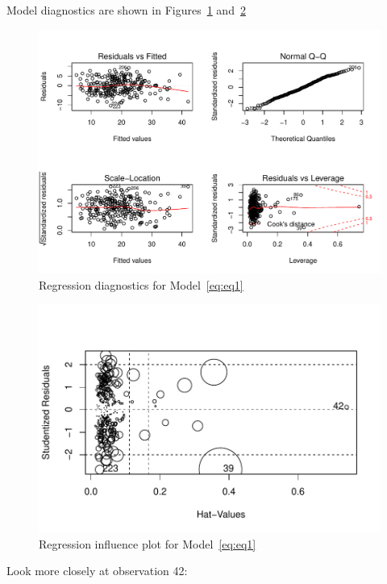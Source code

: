 \documentclass[11pt,letter]{article}\usepackage[]{graphicx}\usepackage[]{color}
\makeatletter
\def\maxwidth{ %
  \ifdim\Gin@nat@width>\linewidth
    \linewidth
  \else
    \Gin@nat@width
  \fi
}
\newenvironment{knitrout}{}{} %
\makeatother
\begin{document}
Model diagnostics are shown in Figures~\ref{fig:fig-diagnostics} and~\ref{fig:influence-plot}

\begin{knitrout}
\color{fgcolor}\begin{figure}[h]

{\centering \includegraphics[width=\maxwidth]{figure/fig-diagnostics-1} 

}

\caption{Regression diagnostics for Model~\eqref{eq:eq1}}\label{fig:fig-diagnostics}
\end{figure}


\end{knitrout}

\begin{knitrout}
\color{fgcolor}\begin{figure}[h]

{\centering \includegraphics[width=\maxwidth]{figure/influence-plot-1} 

}

\caption{Regression influence plot for Model~\eqref{eq:eq1}}\label{fig:influence-plot}
\end{figure}


\end{knitrout}
\FloatBarrier
Look more closely at observation 42:
\end{document}
